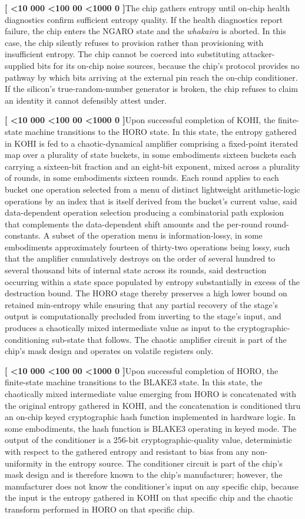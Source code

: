 \documentclass[12pt,letterpaper]{article}
\newcounter{para}
\newcommand{\padzero}{%
  \ifnum\value{para}<10 000\else%
  \ifnum\value{para}<100 00\else%
  \ifnum\value{para}<1000 0\else%
  \fi\fi\fi}
\newcommand{\para}{%
  \refstepcounter{para}\noindent\textbf{[\padzero\arabic{para}]}\hspace{0.5em}\ignorespaces}
\newcounter{claim}
\begin{document}
\para The chip gathers entropy until on-chip health diagnostics confirm sufficient entropy quality. If the health diagnostics report failure, the chip enters the NGARO state and the \emph{whakaira} is aborted. In this case, the chip silently refuses to provision rather than provisioning with insufficient entropy. The chip cannot be coerced into substituting attacker-supplied bits for its on-chip noise sources, because the chip's protocol provides no pathway by which bits arriving at the external pin reach the on-chip conditioner. If the silicon's true-random-number generator is broken, the chip refuses to claim an identity it cannot defensibly attest under.

\para Upon successful completion of KOHI, the finite-state machine transitions to the HORO state. In this state, the entropy gathered in KOHI is fed to a chaotic-dynamical amplifier comprising a fixed-point iterated map over a plurality of state buckets, in some embodiments sixteen buckets each carrying a sixteen-bit fraction and an eight-bit exponent, mixed across a plurality of rounds, in some embodiments sixteen rounds. Each round applies to each bucket one operation selected from a menu of distinct lightweight arithmetic-logic operations by an index that is itself derived from the bucket's current value, said data-dependent operation selection producing a combinatorial path explosion that complements the data-dependent shift amounts and the per-round round-constants. A subset of the operation menu is information-lossy, in some embodiments approximately fourteen of thirty-two operations being lossy, such that the amplifier cumulatively destroys on the order of several hundred to several thousand bits of internal state across its rounds, said destruction occurring within a state space populated by entropy substantially in excess of the destruction bound. The HORO stage thereby preserves a high lower bound on retained min-entropy while ensuring that any partial recovery of the stage's output is computationally precluded from inverting to the stage's input, and produces a chaotically mixed intermediate value as input to the cryptographic-conditioning sub-state that follows. The chaotic amplifier circuit is part of the chip's mask design and operates on volatile registers only.

\para Upon successful completion of HORO, the finite-state machine transitions to the BLAKE3 state. In this state, the chaotically mixed intermediate value emerging from HORO is concatenated with the original entropy gathered in KOHI, and the concatenation is conditioned thru an on-chip keyed cryptographic hash function implemented in hardware logic. In some embodiments, the hash function is BLAKE3 operating in keyed mode. The output of the conditioner is a 256-bit cryptographic-quality value, deterministic with respect to the gathered entropy and resistant to bias from any non-uniformity in the entropy source. The conditioner circuit is part of the chip's mask design and is therefore known to the chip's manufacturer; however, the manufacturer does not know the conditioner's input on any specific chip, because the input is the entropy gathered in KOHI on that specific chip and the chaotic transform performed in HORO on that specific chip.
\end{document}
